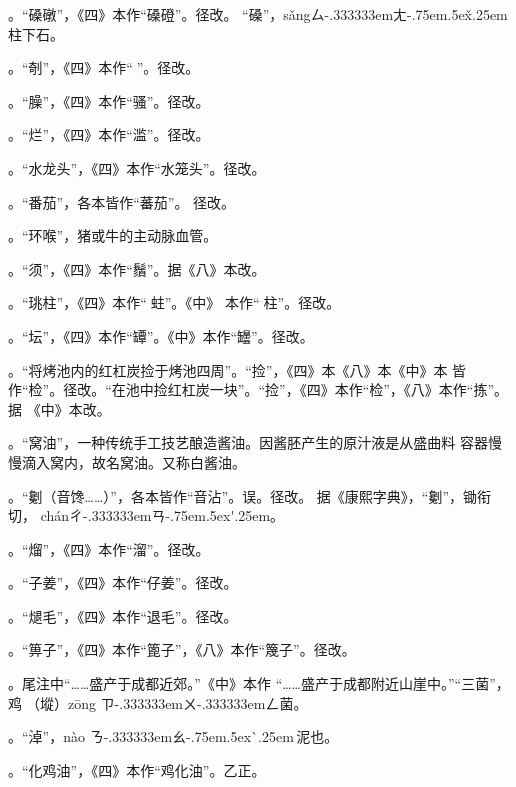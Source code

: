 \begin{list}{}
。“磉礅”，《四》本作“磉磴”。径改。
“磉”，{s\v{a}ng}{ㄙ\kern-.333333emㄤ\kern-.75em\raise.5ex\hbox{\v{}}\kern.25em}
柱下石。

。“剞”，《四》本作“𠟤”。径改。

。“臊”，《四》本作“骚”。径改。

。“烂”，《四》本作“滥”。径改。

。“水龙头”，《四》本作“水笼头”。径改。

。“番茄”，各本皆作“蕃茄”。
径改。

。“环喉”，猪或牛的主动脉血管。

。“须”，《四》本作“鬚”。据《八》本改。

。“珧柱”，《四》本作“𧎼蛀”。《中》
本作“𧎼柱”。径改。

。“坛”，《四》本作“罈”。《中》本作“罎”。径改。

。“将烤池内的红杠炭捡于烤池四周”。“捡”，《四》本《八》本《中》本
皆作“检”。径改。“在池中捡红杠炭一块”。“捡”，《四》本作“检”，《八》本作“拣”。据
《中》本改。

。“窝油”，一种传统手工技艺酿造酱油。因酱胚产生的原汁液是从盛曲料
容器慢慢滴入窝内，故名窝油。又称白酱油。

。“劖（音馋……）”，各本皆作“音沾”。误。径改。
据《康熙字典》，“劖”，锄衔切，
{ch\'{a}n}{ㄔ\kern-.333333emㄢ\kern-.75em\raise.5ex\hbox{\'{}}\kern.25em}。

。“熘”，《四》本作“溜”。径改。

。“子姜”，《四》本作“仔姜”。径改。

。“煺毛”，《四》本作“退毛”。径改。

。“箅子”，《四》本作“篦子”，《八》本作“篾子”。径改。

。尾注{\footnotesize{}}中“……盛产于成都近郊。”《中》本作
“……盛产于成都附近山崖中。”“三菌”，鸡𭎂（㙡）{z\={o}ng}%
{ㄗ\kern-.333333emㄨ\kern-.333333emㄥ}菌。

。“淖”，{n\`{a}o}%
{ㄋ\kern-.333333emㄠ\kern-.75em\raise.5ex\hbox{\`{}}\kern.25em}\,泥也。

。“化鸡油”，《四》本作“鸡化油”。乙正。


\end{list}
